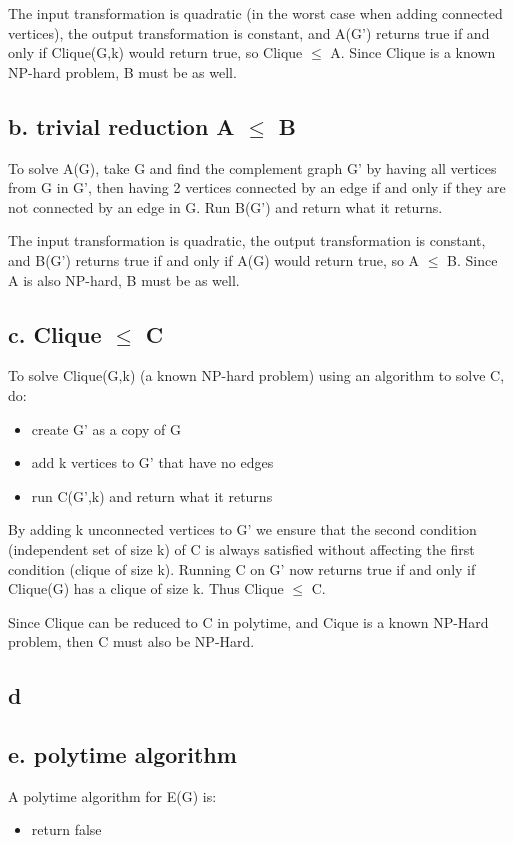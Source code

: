 \documentclass[a4paper]{article}
\begin{document}
The input transformation is quadratic (in the worst case when adding connected vertices), the output transformation is constant, and A(G') returns true if and only if Clique(G,k) would return true, so Clique $\leq$ A. Since Clique is a known NP-hard problem, B must be as well.

\subsection{b. trivial reduction A $\leq$ B}
To solve A(G), take G and find the complement graph G' by having all vertices from G in G', then having 2 vertices connected by an edge if and only if they are not connected by an edge in G. Run B(G') and return what it returns.

The input transformation is quadratic, the output transformation is constant, and B(G') returns true if and only if A(G) would return true, so A $\leq$ B. Since A is also NP-hard, B must be as well.

\subsection{c. Clique $\leq$ C}
To solve Clique(G,k) (a known NP-hard problem) using an algorithm to solve C, do:

\begin{itemize}
    \item create G' as a copy of G
    \item add k vertices to G' that have no edges
    \item run C(G',k) and return what it returns
\end{itemize}

By adding k unconnected vertices to G' we ensure that the second condition (independent set of size k) of C is always satisfied without affecting the first condition (clique of size k). Running C on G' now returns true if and only if Clique(G) has a clique of size k. Thus Clique $\leq$ C.

Since Clique can be reduced to C in polytime, and Cique is a known NP-Hard problem, then C must also be NP-Hard.

\subsection{d}

\subsection{e. polytime algorithm}
A polytime algorithm for E(G) is:
\begin{itemize}
    \item return false
\end{itemize}
\end{document}
